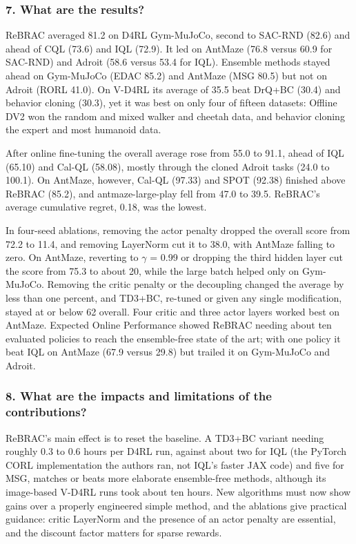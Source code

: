 \documentclass[11pt]{article}
\newcommand{\question}[1]{\subsubsection*{#1}}
\begin{document}
\question{7. What are the results?}

ReBRAC averaged 81.2 on D4RL Gym-MuJoCo, second to SAC-RND (82.6) and ahead of CQL (73.6) and IQL (72.9). It led on AntMaze (76.8 versus 60.9 for SAC-RND) and Adroit (58.6 versus 53.4 for IQL). Ensemble methods stayed ahead on Gym-MuJoCo (EDAC 85.2) and AntMaze (MSG 80.5) but not on Adroit (RORL 41.0). On V-D4RL its average of 35.5 beat DrQ+BC (30.4) and behavior cloning (30.3), yet it was best on only four of fifteen datasets: Offline DV2 won the random and mixed walker and cheetah data, and behavior cloning the expert and most humanoid data.

After online fine-tuning the overall average rose from 55.0 to 91.1, ahead of IQL (65.10) and Cal-QL (58.08), mostly through the cloned Adroit tasks (24.0 to 100.1). On AntMaze, however, Cal-QL (97.33) and SPOT (92.38) finished above ReBRAC (85.2), and antmaze-large-play fell from 47.0 to 39.5. ReBRAC's average cumulative regret, 0.18, was the lowest.

In four-seed ablations, removing the actor penalty dropped the overall score from 72.2 to 11.4, and removing LayerNorm cut it to 38.0, with AntMaze falling to zero. On AntMaze, reverting to \ensuremath{\gamma} = 0.99 or dropping the third hidden layer cut the score from 75.3 to about 20, while the large batch helped only on Gym-MuJoCo. Removing the critic penalty or the decoupling changed the average by less than one percent, and TD3+BC, re-tuned or given any single modification, stayed at or below 62 overall. Four critic and three actor layers worked best on AntMaze. Expected Online Performance showed ReBRAC needing about ten evaluated policies to reach the ensemble-free state of the art; with one policy it beat IQL on AntMaze (67.9 versus 29.8) but trailed it on Gym-MuJoCo and Adroit.

\question{8. What are the impacts and limitations of the contributions?}

ReBRAC's main effect is to reset the baseline. A TD3+BC variant needing roughly 0.3 to 0.6 hours per D4RL run, against about two for IQL (the PyTorch CORL implementation the authors ran, not IQL's faster JAX code) and five for MSG, matches or beats more elaborate ensemble-free methods, although its image-based V-D4RL runs took about ten hours. New algorithms must now show gains over a properly engineered simple method, and the ablations give practical guidance: critic LayerNorm and the presence of an actor penalty are essential, and the discount factor matters for sparse rewards.
\end{document}

